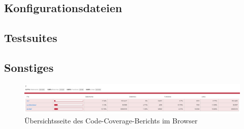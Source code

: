 \subsection{Konfigurationsdateien}

	

	

	

\subsection{Testsuites}
	

	

	

	

	

	

	

\subsection{Sonstiges}
\begin{figure}[H]
	\includegraphics[width=\textwidth]{abb/code-cov-1.png}
	\caption{Übersichtsseite des Code-Coverage-Berichts im Browser}
	\label{abb:code-cov-1}
\end{figure}

